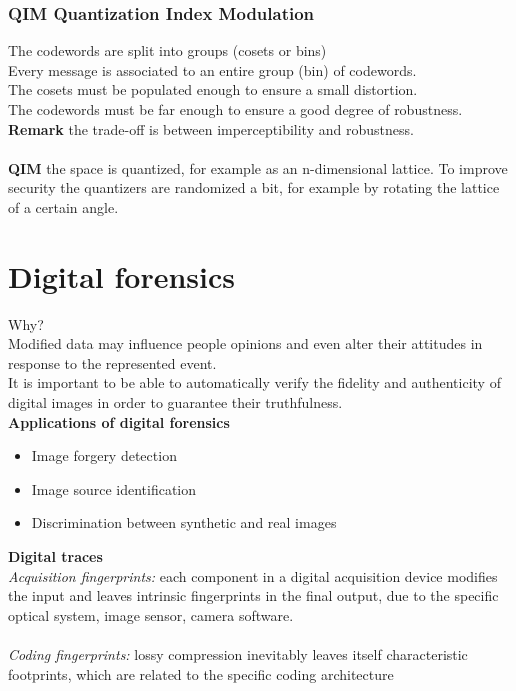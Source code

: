 \documentclass[10pt,a4paper]{book}
\begin{document}
\subsection{QIM Quantization Index Modulation}

The codewords are split into groups (cosets or bins)\\
Every message is associated to an entire group (bin) of codewords.\\
The cosets must be populated enough to ensure a small distortion.\\
The codewords must be far enough to ensure a good degree of robustness.\\
\textbf{Remark} the trade-off is between imperceptibility and robustness.\\\\
\textbf{QIM} the space is quantized, for example as an n-dimensional lattice. To improve security the quantizers are randomized a bit, for example by rotating the lattice of a certain angle.

\newpage
\chapter{Digital forensics}
Why?\\
Modified data may influence people opinions and even alter their attitudes in response to the represented event.\\
It is important to be able to automatically verify the fidelity and
authenticity of digital images in order to guarantee their
truthfulness.\\
\textbf{Applications of digital forensics} 
\begin{itemize}
\item Image forgery detection 
\item  Image source identification 
\item  Discrimination between synthetic and real images
\end{itemize}
\textbf{Digital traces}\\
\emph{Acquisition fingerprints:} each component in a digital acquisition device modifies the input and leaves intrinsic fingerprints in the final output, due to the specific optical system, image sensor, camera software.\\\\
\emph{Coding fingerprints:} lossy compression inevitably leaves itself characteristic footprints, which are related to the specific coding architecture
\end{document}

